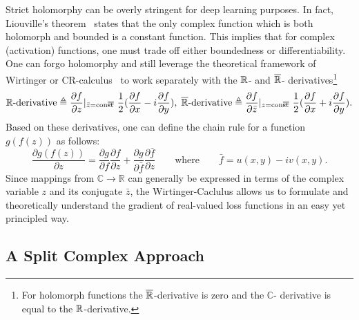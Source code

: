 \documentclass{article}
\begin{document}
Strict holomorphy can be overly stringent for deep learning purposes.  In fact, Liouville's theorem~\cite{Liouville} states that the only complex function which is both holomorph and bounded is a constant function. This implies that for complex (activation) functions, one must trade off either boundedness %
or differentiability. One can forgo holomorphy and still leverage the theoretical framework of Wirtinger or CR-calculus~\cite{Delgado,Mandic} to work separately with the $\mathbb{R}$- and $\overline{\mathbb{R}}$- derivatives\footnote{For holomorph functions the $\overline{\mathbb{R}}$-derivative is zero and the $\mathbb{C}$- derivative is equal to the $\mathbb{R}$-derivative.} %
\begin{equation}
    \mbR\text{-derivative} \triangleq \frac{\partial f}{\partial z}|_{\bar{z}=\text{const}}\mkern-18mu = \frac{1}{2}(\frac{\partial f}{\partial x} - i \frac{\partial f}{\partial y}),\; \overline{\mbR}\text{-derivative} \triangleq \frac{\partial f}{\partial \bar{z}}|_{z=\text{const}}\mkern-18mu = \frac{1}{2}(\frac{\partial f}{\partial x} + i \frac{\partial f}{\partial y}).
\end{equation}
Based on these derivatives, one can define the chain rule for a function $g(f(z))$ as follows:
\begin{equation}
    \frac{\partial g(f(z))}{\partial z} = \frac{\partial g}{\partial f} \frac{\partial f}{\partial z} + \frac{\partial g}{\partial \bar{f}} \frac{\partial \bar{f}}{\partial z} \qquad \text{where} \qquad \bar{f} = u(x,y) - iv(x,y).
\end{equation}
Since mappings from $\mathbb{C} \to \mathbb{R}$ can generally be expressed in terms of the complex variable $z$ and its conjugate $\bar{z}$, the Wirtinger-Caclulus allows us to formulate and theoretically understand the gradient of real-valued loss functions in an easy yet principled way.

\subsection{A Split Complex Approach}
\end{document}
